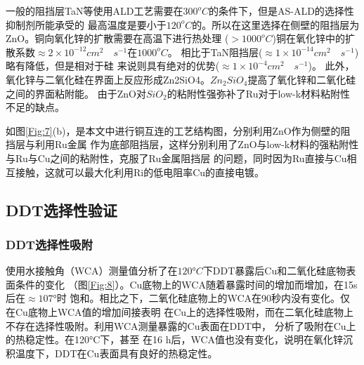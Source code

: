 \documentclass[UTF8,a4paper,12pt]{ctexart}%
\begin{document}
一般的阻挡层TaN等使用ALD工艺需要在$300^oC$的条件下，但是AS-ALD的选择性抑制剂所能承受的
最高温度是要小于$120^oC$的。所以在这里选择在侧壁的阻挡层为ZnO。铜向氧化锌的扩散需要在高温下进行热处理
($> 1000^oC$)铜在氧化锌中的扩散系数$\approx 2 \times 10^{-12}cm^2 \quad s ^{-1}$在$1000^oC$。
相比于TaN阻挡层($\approx 1 \times 10^{-14} cm^2\quad s^{-1}$)略有降低，但是相对于硅
来说则具有绝对的优势($\approx 1 \times 10^{-4} cm^2 \quad s^{-1}$)。
此外，氧化锌与二氧化硅在界面上反应形成Zn2SiO4。$Zn_2SiO_4$提高了氧化锌和二氧化硅之间的界面粘附能。
由于ZnO对$SiO_2$的粘附性强弥补了Ru对于low-k材料粘附性不足的缺点。


如图\ref{Fig:7}(b)，是本文中进行铜互连的工艺结构图，分别利用ZnO作为侧壁的阻挡层与利用Ru金属
作为底部阻挡层，这样分别利用了ZnO与low-k材料的强粘附性与Ru与Cu之间的粘附性，克服了Ru金属阻挡层
的问题，同时因为Ru直接与Cu相互接触，这就可以最大化利用Ri的低电阻率Cu的直接电镀。



\subsection{DDT选择性验证}


\subsubsection{DDT选择性吸附}

使用水接触角（WCA）测量值分析了在$120°C$下DDT暴露后Cu和二氧化硅底物表面条件的变化
（图\ref{Fig:8}）。Cu底物上的WCA随着暴露时间的增加而增加，在15s后在$\approx 107°$时
饱和。相比之下，二氧化硅底物上的WCA在90秒内没有变化。仅在Cu底物上WCA值的增加间接表明
在Cu上的选择性吸附，而在二氧化硅底物上不存在选择性吸附。利用WCA测量暴露的Cu表面在DDT中，
分析了吸附在Cu上的热稳定性。在120°C下，甚至
在16 h后，WCA值也没有变化，说明在氧化锌沉积温度下，DDT在Cu表面具有良好的热稳定性。
\end{document}
